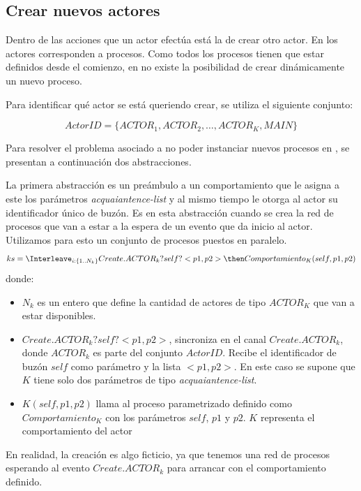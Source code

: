\subsection{Crear nuevos actores}\label{modelo:crear}

Dentro de las acciones que un actor efectúa está la de crear otro actor. En \CSP los actores corresponden a procesos. Como todos los procesos tienen que estar definidos desde el comienzo, en \CSP no existe la posibilidad de crear dinámicamente un nuevo proceso.

Para identificar qué actor se está queriendo crear, se utiliza el siguiente conjunto: 

\begin{equation}\label{eq:actorid}
  ActorID = \Big\{ ACTOR_1, ACTOR_2, \ldots, ACTOR_K, MAIN \Big\}
\end{equation}

Para resolver el problema asociado a no poder instanciar nuevos procesos en \CSP, se presentan a continuación dos abstracciones.

La primera abstracción es un preámbulo a un comportamiento que le asigna a este los parámetros \textit{acquaiantence-list} y al mismo tiempo le otorga al actor su identificador único de buzón. Es en esta abstracción cuando se crea la red de procesos que van a estar a la espera de un evento que da inicio al actor. Utilizamos para esto un conjunto de procesos puestos en paralelo.
\begin{equation}\label{eq:createactor}
ks = \Interleave_{i: \{1 .. N_k\}} Create.ACTOR_k?self?<p1, p2> \then Comportamiento_K(self, p1, p2) 
\end{equation}
donde:
\begin{itemize}
 \item $N_k$ es un entero que define la cantidad de actores de tipo $ACTOR_K$ que van a estar disponibles.
 \item $Create.ACTOR_k?self?<p1, p2>$, sincroniza en el canal $Create.ACTOR_k$, donde $ACTOR_k$ es parte del conjunto $ActorID$. Recibe el identificador de buzón $self$ como parámetro y la lista $<p1, p2>$. En este caso se supone que $K$ tiene solo dos parámetros de tipo \textit{acquaiantence-list}. 
 \item $K(self, p1, p2)$ llama al proceso parametrizado definido como $Comportamiento_K$ con los parámetros $self$, $p1$ y $p2$. $K$ representa el comportamiento del actor
\end{itemize}

En realidad, la creación es algo ficticio, ya que tenemos una red de procesos \CSP esperando al evento $Create.ACTOR_k$ para arrancar con el comportamiento definido. 

